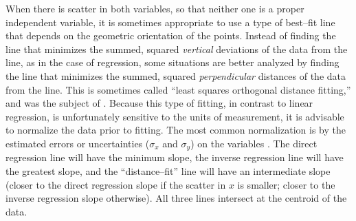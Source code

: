 When there is scatter in both variables, so that neither one is a
proper independent variable, it is sometimes appropriate to use a type
of best--fit line that depends on the geometric orientation of the
points.  Instead of finding the line that minimizes the summed,
squared {\it vertical} deviations of the data from the line, as in the
case of regression, some situations are better analyzed by finding the
line that minimizes the summed, squared {\it perpendicular} distances
of the data from the line.  This is sometimes called ``least squares
orthogonal distance fitting,'' and was the subject of
\citet{pearson1901}.  Because this type of fitting, in contrast to
linear regression, is unfortunately sensitive to the units of
measurement, it is advisable to normalize the data prior to fitting.
The most common normalization is by the estimated errors or
uncertainties ($\sigma_x$ and $\sigma_y$) on the variables
\citep{NR1992, akritas+bershady1996}.  The direct regression line will
have the minimum slope, the inverse regression line will have the
greatest slope, and the ``distance--fit'' line will have an
intermediate slope (closer to the direct regression slope if the
scatter in $x$ is smaller; closer to the inverse regression slope
otherwise).  All three lines intersect at the centroid of the data.

